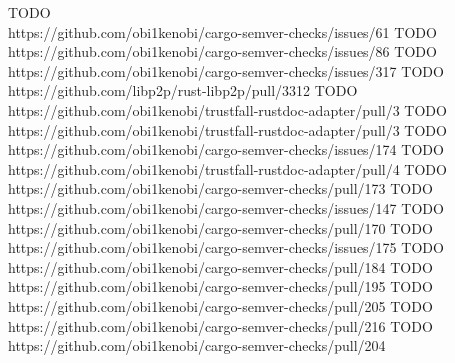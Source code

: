 \documentclass[licencjacka,en]{pracamgr}
\begin{document}
\begin{thebibliography}{99}
 TODO \\ https://github.com/obi1kenobi/cargo-semver-checks/issues/61
 TODO \\ https://github.com/obi1kenobi/cargo-semver-checks/issues/86
 TODO \\ https://github.com/obi1kenobi/cargo-semver-checks/issues/317
 TODO \\ https://github.com/libp2p/rust-libp2p/pull/3312
 TODO \\ https://github.com/obi1kenobi/trustfall-rustdoc-adapter/pull/3
 TODO \\ https://github.com/obi1kenobi/trustfall-rustdoc-adapter/pull/3
 TODO \\ https://github.com/obi1kenobi/cargo-semver-checks/issues/174
 TODO \\ https://github.com/obi1kenobi/trustfall-rustdoc-adapter/pull/4
 TODO \\ https://github.com/obi1kenobi/cargo-semver-checks/pull/173
 TODO \\ https://github.com/obi1kenobi/cargo-semver-checks/issues/147
 TODO \\ https://github.com/obi1kenobi/cargo-semver-checks/pull/170
 TODO \\ https://github.com/obi1kenobi/cargo-semver-checks/issues/175
 TODO \\ https://github.com/obi1kenobi/cargo-semver-checks/pull/184
 TODO \\ https://github.com/obi1kenobi/cargo-semver-checks/pull/195
 TODO \\ https://github.com/obi1kenobi/cargo-semver-checks/pull/205
 TODO \\ https://github.com/obi1kenobi/cargo-semver-checks/pull/216
 TODO \\ https://github.com/obi1kenobi/cargo-semver-checks/pull/204

\end{thebibliography}
\end{document}
